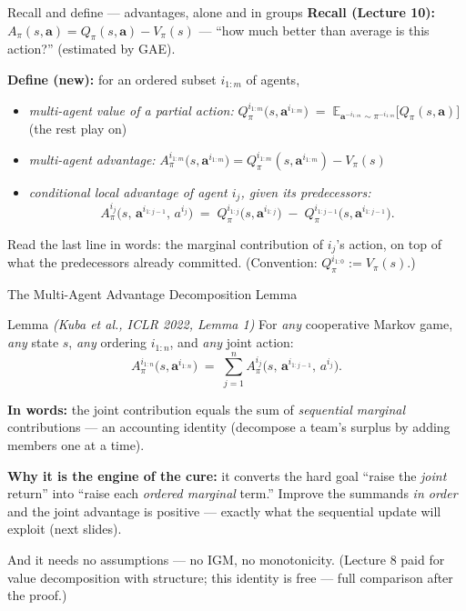 \documentclass[10pt, aspectratio=169]{beamer}
\newcommand{\paper}[1]{\textcolor{mLightBrown}{\small\textit{(#1)}}}
\begin{document}
\begin{frame}{Recall and define --- advantages, alone and in groups}
\textbf{Recall (Lecture 10):} $A_\pi(s,\mathbf{a}) = Q_\pi(s,\mathbf{a}) - V_\pi(s)$ --- ``how much better than average is this action?'' (estimated by GAE).
\medskip

\pause
\textbf{Define (new):} for an ordered subset $i_{1:m}$ of agents,
\begin{itemize}\setlength\itemsep{4pt}
\item \emph{multi-agent value of a partial action:} \; $\displaystyle Q^{i_{1:m}}_{\pi}\big(s, \mathbf{a}^{i_{1:m}}\big) \;=\; \mathbb{E}_{\mathbf{a}^{-i_{1:m}} \sim \pi^{-i_{1:m}}}\big[ Q_\pi(s, \mathbf{a}) \big]$ \hfill {\footnotesize(the rest play on)}
\item \emph{multi-agent advantage:} \; $A^{i_{1:m}}_{\pi}\big(s,\mathbf{a}^{i_{1:m}}\big) = Q^{i_{1:m}}_{\pi}(s,\mathbf{a}^{i_{1:m}}) - V_\pi(s)$
\item \emph{conditional local advantage of agent $i_j$, given its predecessors:}
\[
A^{i_j}_{\pi}\big(s,\, \mathbf{a}^{i_{1:j-1}},\, a^{i_j}\big) \;=\; Q^{i_{1:j}}_{\pi}\big(s, \mathbf{a}^{i_{1:j}}\big) \;-\; Q^{i_{1:j-1}}_{\pi}\big(s, \mathbf{a}^{i_{1:j-1}}\big).
\]
\end{itemize}
\medskip
\pause
Read the last line in words: \alert{the marginal contribution of $i_j$'s action, on top of what the predecessors already committed.} (Convention: $Q^{i_{1:0}}_\pi := V_\pi(s)$.)
\end{frame}

\begin{frame}{The Multi-Agent Advantage Decomposition Lemma}
\begin{block}{Lemma \hfill {\scriptsize\normalfont\paper{Kuba et al., ICLR 2022, Lemma 1}}}
\centering
For \emph{any} cooperative Markov game, \emph{any} state $s$, \emph{any} ordering $i_{1:n}$, and \emph{any} joint action:
\[
A^{i_{1:n}}_{\pi}\big(s, \mathbf{a}^{i_{1:n}}\big) \;=\; \sum_{j=1}^{n} A^{i_j}_{\pi}\big(s,\, \mathbf{a}^{i_{1:j-1}},\, a^{i_j}\big).
\]
\end{block}
\medskip

\textbf{In words:} the joint contribution equals the sum of \emph{sequential marginal} contributions --- an accounting identity (decompose a team's surplus by adding members one at a time).
\smallskip

\pause
\textbf{Why it is the engine of the cure:} it converts the hard goal ``raise the \emph{joint} return'' into ``raise each \emph{ordered marginal} term.'' Improve the summands \emph{in order} and the joint advantage is positive --- exactly what the sequential update will exploit (next slides).
\smallskip

\pause
\alert{And it needs no assumptions} --- no IGM, no monotonicity. {\footnotesize\textcolor{mLightBrown}{(Lecture 8 paid for value decomposition with structure; this identity is free --- full comparison after the proof.)}}
\end{frame}
\end{document}
